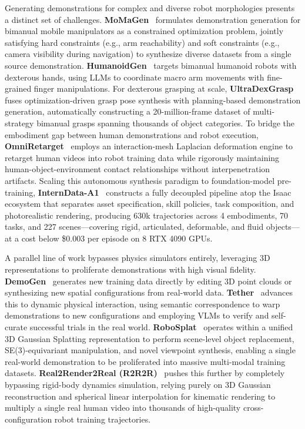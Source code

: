 \documentclass[acmsmall,screen,review,anonymous]{acmart}
\begin{document}
Generating demonstrations for complex and diverse robot morphologies presents a distinct set of challenges. \textbf{MoMaGen}~\cite{li2026momagengeneratingdemonstrationssoft} formulates demonstration generation for bimanual mobile manipulators as a constrained optimization problem, jointly satisfying hard constraints (e.g., arm reachability) and soft constraints (e.g., camera visibility during navigation) to synthesize diverse datasets from a single source demonstration. \textbf{HumanoidGen}~\cite{jing2025humanoidgen} targets bimanual humanoid robots with dexterous hands, using LLMs to coordinate macro arm movements with fine-grained finger manipulations. For dexterous grasping at scale, \textbf{UltraDexGrasp}~\cite{yang2026ultradexgrasp} fuses optimization-driven grasp pose synthesis with planning-based demonstration generation, automatically constructing a 20-million-frame dataset of multi-strategy bimanual grasps spanning thousands of object categories. To bridge the embodiment gap between human demonstrations and robot execution, \textbf{OmniRetarget}~\cite{yang2025omniretarget} employs an interaction-mesh Laplacian deformation engine to retarget human videos into robot training data while rigorously maintaining human-object-environment contact relationships without interpenetration artifacts. Scaling this autonomous synthesis paradigm to foundation-model pre-training, \textbf{InternData-A1}~\cite{cai2026internvla} constructs a fully decoupled pipeline atop the Isaac ecosystem that separates asset specification, skill policies, task composition, and photorealistic rendering, producing 630k trajectories across 4 embodiments, 70 tasks, and 227 scenes---covering rigid, articulated, deformable, and fluid objects---at a cost below \$0.003 per episode on 8 RTX 4090 GPUs.

A parallel line of work bypasses physics simulators entirely, leveraging 3D representations to proliferate demonstrations with high visual fidelity. \textbf{DemoGen}~\cite{xue2025demogen} generates new training data directly by editing 3D point clouds or synthesizing new spatial configurations from real-world data. \textbf{Tether}~\cite{liang2026tether} advances this to dynamic physical interaction, using semantic correspondence to warp demonstrations to new configurations and employing VLMs to verify and self-curate successful trials in the real world. \textbf{RoboSplat}~\cite{robosplat2025} operates within a unified 3D Gaussian Splatting representation to perform scene-level object replacement, SE(3)-equivariant manipulation, and novel viewpoint synthesis, enabling a single real-world demonstration to be proliferated into massive multi-modal training datasets. \textbf{Real2Render2Real (R2R2R)}~\cite{yu2025r2r2r} pushes this further by completely bypassing rigid-body dynamics simulation, relying purely on 3D Gaussian reconstruction and spherical linear interpolation for kinematic rendering to multiply a single real human video into thousands of high-quality cross-configuration robot training trajectories.
\end{document}
